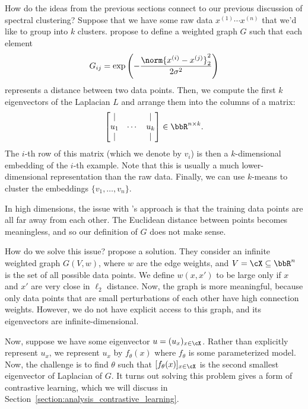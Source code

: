 
How do the ideas from the previous sections connect to our previous discussion of spectral clustering? Suppose that we have some raw data $x^{(1)} \cdots x^{(n)}$ that we'd like to group into $k$ clusters. \citet{ng2001spectral} propose to define a weighted graph $G$ such that each element 
\begin{equation}
    G_{ij} = \exp \left( -\frac{\norm{x^{(i)} - x^{(j)}}^2_2}{2\sigma^2} \right)
\end{equation}
represents a distance between two data points. Then, we compute the first $k$ eigenvectors of the Laplacian $L$ and arrange them into the columns of a matrix: 
\begin{equation}
    \begin{bmatrix} \lvert &  & \lvert \\ u_1 & \cdots &  u_k \\ \lvert &  & \lvert \end{bmatrix} \in \bbR^{n \times k}.
\end{equation} 
The $i$-th row of this matrix (which we denote by $v_i$) is then a $k$-dimensional embedding of the $i$-th example. Note that this is usually a much lower-dimensional representation than the raw data. Finally, we can use $k$-means to cluster the embeddings $\{v_1,\dots,v_n\}$.

In high dimensions, the issue with \citet{ng2001spectral}'s approach is that the training data points are all far away from each other. The Euclidean distance between points becomes meaningless, and so our definition of $G$ does not make sense. 

How do we solve this issue? \citet{haochen2021provable} propose a solution. They consider an infinite weighted graph $G(V, w)$, where $w$ are the edge weights, and $V = \cX \subseteq \bbR^n$ is the set of all possible data points. We define $w(x, x')$ to be large only if $x$ and $x'$ are very close in $\ell_2$ distance. Now, the graph is more meaningful, because only data points that are small perturbations of each other have high connection weights. However, we do not have explicit access to this graph, and its eigenvectors are infinite-dimensional. 

Now, suppose we have some eigenvector $u = (u_x)_{x \in \cX} $. Rather than explicitly represent $u_x$, we represent $u_x$ by $f_\theta(x)$ where $f_\theta$ is some parameterized model. Now, the challenge is to find $\theta$ such that $[f_\theta(x)]_{x \in \cX}$ is the second smallest eigenvector of Laplacian of $G$. It turns out solving this problem gives a form of contrastive learning, which we will discuss in Section~\ref{section:analysis_contrastive_learning}.


